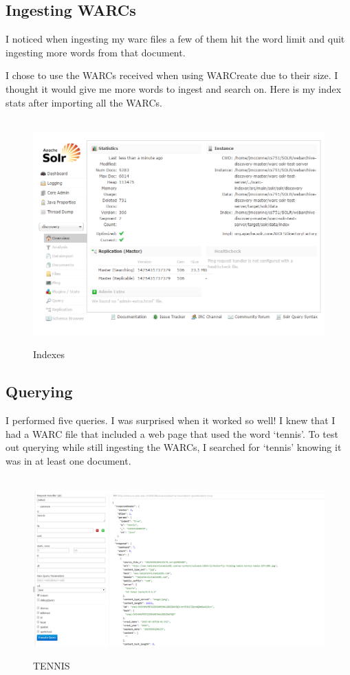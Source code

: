 \documentclass[12pt]{article}
\begin{document}
\subsection{Ingesting WARCs}
I noticed when ingesting my warc files a few of them hit the word limit and quit ingesting more words from that document.

I chose to use the WARCs received when using WARCreate due to their size. I thought it would give me more words to ingest and search on.  Here is my index stats after importing all the WARCs.

\begin{figure}[H]
    \caption{Indexes}
    \centering
    \includegraphics[scale=0.5]{indexes.PNG}
\end{figure}

\subsection{Querying}

I performed five queries.  I was surprised when it worked so well! I knew that I had a WARC file that included a web page that used the word `tennis'.  To test out querying while still ingesting the WARCs, I searched for `tennis' knowing it was in at least one document.

\begin{figure}[H]
    \caption{TENNIS}
    \centering
    \includegraphics[scale=0.5]{tennis.PNG}
\end{figure}
\end{document}
